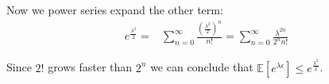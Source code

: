 \documentclass{article}
\begin{document}
Now we power series expand the other term:
\begin{align}
	e^{\frac{\lambda^2}{2}} =& \sum_{n=0}^{\infty}\frac{\left( \frac{\lambda^2}{2}\right) ^n}{n!} = \sum_{n=0}^{\infty}\frac{ \lambda^{2n}}{2^n n!} 
\end{align}

Since $2!$ grows faster than $2^n$ we can conclude that $\mathbb{E}[e^{\lambda\epsilon}] \leq e^{\frac{\lambda^2}{2}}$.
\end{document}
